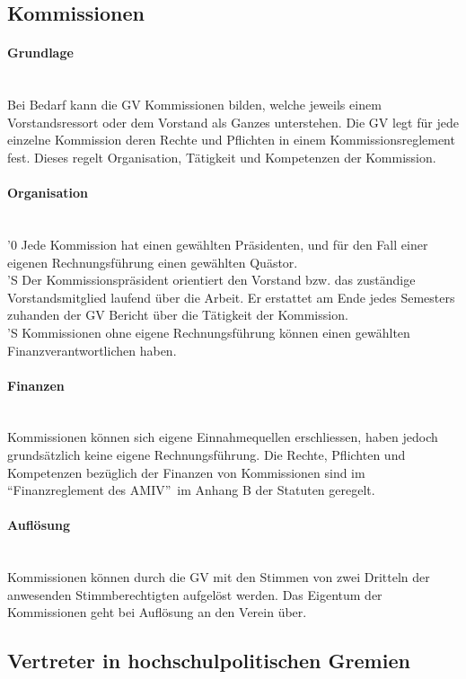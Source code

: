\documentclass[a4paper,11pt]{article}
\newcommand{\nl}{\\[1.5ex]}
\begin{document}
\subsection{Kommissionen}
\paragraph{Grundlage} \ \\
Bei Bedarf kann die GV Kommissionen bilden, welche jeweils einem Vorstandsressort oder dem Vorstand als Ganzes unterstehen. Die GV legt für jede einzelne Kommission deren Rechte und Pflichten in einem Kommissionsreglement fest. Dieses regelt Organisation, Tätigkeit und Kompetenzen der Kommission.


\paragraph{Organisation} \ \\
'0 Jede Kommission hat einen gewählten Präsidenten, und für den Fall einer eigenen Rechnungsführung einen gewählten Quästor. \nl
'S Der Kommissionspräsident orientiert den Vorstand bzw. das zuständige Vorstandsmitglied laufend über die Arbeit. Er erstattet am Ende jedes Semesters zuhanden der GV Bericht über die Tätigkeit der Kommission. \nl
'S Kommissionen ohne eigene Rechnungsführung können einen gewählten Finanzverantwortlichen haben.


\paragraph{Finanzen} \ \\
Kommissionen können sich eigene Einnahmequellen erschliessen, haben jedoch grundsätzlich keine eigene Rechnungsführung. Die Rechte, Pflichten und Kompetenzen bezüglich der Finanzen von Kommissionen sind im ``Finanzreglement des AMIV''\ im Anhang B der Statuten geregelt.


\paragraph{Auflösung} \ \\
Kommissionen können durch die GV mit den Stimmen von zwei Dritteln der anwesenden Stimmberechtigten aufgelöst werden. Das Eigentum der Kommissionen geht bei Auflösung an den Verein über.


\subsection{Vertreter in hochschulpolitischen Gremien}
\end{document}
